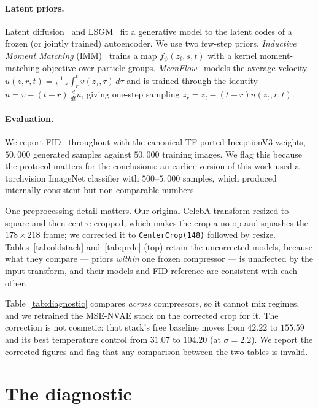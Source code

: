 \documentclass[sigconf,nonacm]{acmart}
\begin{document}
\paragraph{Latent priors.}
Latent diffusion~\cite{ldm} and LSGM~\cite{lsgm} fit a generative model to the
latent codes of a frozen (or jointly trained) autoencoder. We use two few-step
priors. \emph{Inductive Moment Matching} (IMM)~\cite{imm} trains a map
$f_\psi(z_t,s,t)$ with a kernel moment-matching objective over particle groups.
\emph{MeanFlow}~\cite{meanflow} models the average velocity
$u(z,r,t)=\tfrac{1}{t-r}\int_r^t v(z_\tau,\tau)\,d\tau$ and is trained through
the identity $u = v - (t-r)\,\tfrac{d}{dt}u$, giving one-step sampling
$z_r = z_t - (t-r)u(z_t,r,t)$.

\paragraph{Evaluation.}
We report FID~\cite{fid} throughout with the canonical TF-ported InceptionV3
weights, $50{,}000$ generated samples against $50{,}000$ training images. We
flag this because the protocol matters for the conclusions: an earlier version
of this work used a torchvision ImageNet classifier with $500$--$5{,}000$
samples, which produced internally consistent but non-comparable numbers.

One preprocessing detail matters. Our original CelebA transform resized to
square and then centre-cropped, which makes the crop a no-op and squashes the
$178{\times}218$ frame; we corrected it to \texttt{CenterCrop(148)} followed by
resize. Tables~\ref{tab:oldstack} and~\ref{tab:prdc} (top) retain the
uncorrected models, because what they compare --- priors \emph{within} one
frozen compressor --- is unaffected by the input transform, and their models and
FID reference are consistent with each other.

Table~\ref{tab:diagnostic} compares \emph{across} compressors, so it cannot mix
regimes, and we retrained the MSE-NVAE stack on the corrected crop for it. The
correction is not cosmetic: that stack's free baseline moves from $42.22$ to $155.59$ and its best temperature control from $31.07$ to $104.20$ (at $\sigma=2.2$). We report the corrected
figures and flag that any comparison between the two tables is invalid.

\section{The diagnostic}
\label{sec:nogap}
\end{document}
